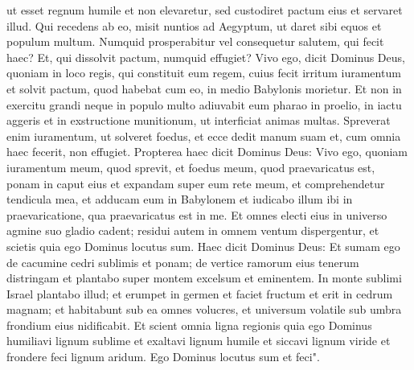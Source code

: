 \begin{biblechapter}
\verse ut esset regnum humile et non elevaretur, sed custodiret pactum eius et servaret illud. 
\verse Qui recedens ab eo, misit nuntios ad Aegyptum, ut daret sibi equos et populum multum. Numquid prosperabitur vel consequetur salutem, qui fecit haec? Et, qui dissolvit pactum, numquid effugiet? 
\verse Vivo ego, dicit Dominus Deus, quoniam in loco regis, qui constituit eum regem, cuius fecit irritum iuramentum et solvit pactum, quod habebat cum eo, in medio Babylonis morietur. 
\verse Et non in exercitu grandi neque in populo multo adiuvabit eum pharao in proelio, in iactu aggeris et in exstructione munitionum, ut interficiat animas multas. 
\verse Spreverat enim iuramentum, ut solveret foedus, et ecce dedit manum suam et, cum omnia haec fecerit, non effugiet. 
\verse Propterea haec dicit Dominus Deus: Vivo ego, quoniam iuramentum meum, quod sprevit, et foedus meum, quod praevaricatus est, ponam in caput eius 
\verse et expandam super eum rete meum, et comprehendetur tendicula mea, et adducam eum in Babylonem et iudicabo illum ibi in praevaricatione, qua praevaricatus est in me. 
\verse Et omnes electi eius in universo agmine suo gladio cadent; residui autem in omnem ventum dispergentur, et scietis quia ego Dominus locutus sum. 
\verse Haec dicit Dominus Deus: Et sumam ego de cacumine cedri sublimis et ponam; de vertice ramorum eius tenerum distringam et plantabo super montem excelsum et eminentem. 
\verse In monte sublimi Israel plantabo illud; et erumpet in germen et faciet fructum et erit in cedrum magnam; et habitabunt sub ea omnes volucres, et universum volatile sub umbra frondium eius nidificabit. 
\verse Et scient omnia ligna regionis quia ego Dominus humiliavi lignum sublime et exaltavi lignum humile et siccavi lignum viride et frondere feci lignum aridum. Ego Dominus locutus sum et feci".   
\end{biblechapter}

